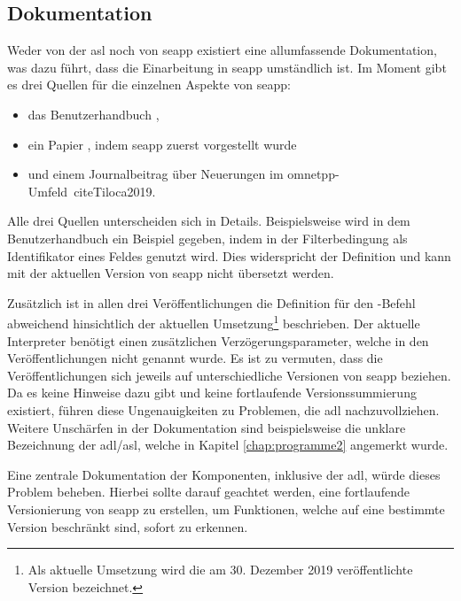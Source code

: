 \subsection{Dokumentation}\label{aus:Dokumentation}
Weder von der \gls{asl} noch von \gls{seapp} existiert eine allumfassende Dokumentation, was dazu führt, dass die Einarbeitung in \gls{seapp} umständlich ist. Im Moment gibt es drei Quellen für die einzelnen Aspekte von \gls{seapp}:
\begin{itemize}
	\item das Benutzerhandbuch \cite{SEAManual},
	\item ein Papier \cite{Tiloca2014}, indem \gls{seapp} zuerst vorgestellt wurde
	\item und einem Journalbeitrag über Neuerungen im \gls{omnetpp}-Umfeld\ cite{Tiloca2019}.
\end{itemize}  
Alle drei Quellen unterscheiden sich in Details. Beispielsweise wird in dem Benutzerhandbuch \cite[Listing 3.13]{SEAManual} ein Beispiel gegeben, indem in der Filterbedingung  als Identifikator eines Feldes genutzt wird. Dies widerspricht der Definition \cite[]{Tiloca2019} und kann mit der aktuellen Version von \gls{seapp} nicht übersetzt werden.

Zusätzlich ist in allen drei Veröffentlichungen die Definition für den -Befehl abweichend hinsichtlich der aktuellen Umsetzung\footnote{Als aktuelle Umsetzung wird die am 30. Dezember 2019 veröffentlichte Version bezeichnet.} beschrieben. Der aktuelle Interpreter benötigt einen zusätzlichen Verzögerungsparameter, welche in den Veröffentlichungen nicht genannt wurde. Es ist zu vermuten, dass die Veröffentlichungen sich jeweils auf unterschiedliche Versionen von \gls{seapp} beziehen. Da es keine Hinweise dazu gibt und keine fortlaufende Versionssummierung existiert, führen diese Ungenauigkeiten zu Problemen, die \gls{adl} nachzuvollziehen. Weitere Unschärfen in der Dokumentation sind beispielsweise die unklare Bezeichnung der \gls{adl}/\gls{asl}, welche in Kapitel \ref{chap:programme2} angemerkt wurde.

Eine zentrale Dokumentation der Komponenten, inklusive der \gls{adl}, würde dieses Problem beheben. Hierbei sollte darauf geachtet werden, eine fortlaufende Versionierung von \gls{seapp} zu erstellen, um Funktionen, welche auf eine bestimmte Version beschränkt sind, sofort zu erkennen.

